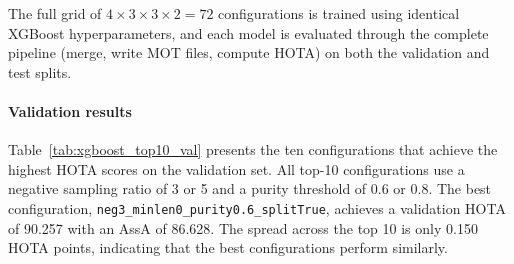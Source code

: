 The full grid of $4 \times 3 \times 3 \times 2 = 72$ configurations is trained using identical XGBoost hyperparameters, and each model is evaluated through the complete pipeline (merge, write MOT files, compute HOTA) on both the validation and test splits.

\paragraph{Validation results}
Table~\ref{tab:xgboost_top10_val} presents the ten configurations that achieve the highest HOTA scores on the validation set. All top-10 configurations use a negative sampling ratio of 3 or 5 and a purity threshold of 0.6 or 0.8. The best configuration, \texttt{neg3\_minlen0\_purity0.6\_splitTrue}, achieves a validation HOTA of 90.257 with an AssA of 86.628. The spread across the top 10 is only 0.150 HOTA points, indicating that the best configurations perform similarly.

\begin{table}[H]
\centering
{}
\caption{Top-10 XGBoost connector configurations ranked by validation HOTA. All models use a default merge threshold of 0.5 and average linkage. Val F1 is the binary classification F1 on held-out validation pairs.}
\label{tab:xgboost_top10_val}
\end{table}

